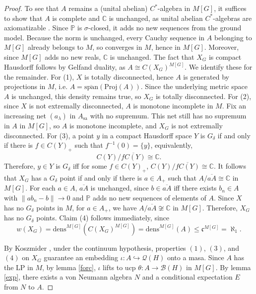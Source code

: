 \documentclass[10pt]{amsart}
\theoremstyle{definition}
\begin{document}
\begin{proof}
    To see that $A$ remains a (unital abelian) $C^*$-algebra in $M[G]$, it suffices to show that $A$ is complete and $\mathbb{C}$ is unchanged, as unital abelian $C^*$-algebras are axiomatizable \cite[2.5.1]{FA21}. Since $\mathbb{P}$ is $\sigma$-closed, it adds no new sequences from the ground model. Because the norm is unchanged, every Cauchy sequence in $A$ belonging to $M[G]$ already belongs to $M$, so converges in $M$, hence in $M[G]$. Moreover, since $M[G]$ adds no new reals, $\mathbb{C}$ is unchanged. The fact that $X_G$ is compact Hausdorff follows by Gelfand duality, as $A\cong C(X_G)^{M[G]}$. We identify these for the remainder. For (1), $X$ is totally disconnected, hence $A$ is generated by projections in $M$, i.e. $A=\overline{\mathrm{span}}(\mathrm{Proj}(A))$. Since the underlying metric space $A$ is unchanged, this density remains true, so $X_G$ is totally disconnected. For (2), since $X$ is not extremally disconnected, $A$ is monotone incomplete in $M$. Fix an increasing net $(a_\lambda)$ in $A_\text{sa}$ with no supremum. This net still has no supremum in $A$ in $M[G]$, so $A$ is monotone incomplete, and $X_G$ is not extremally disconnected. For (3), a point $y$ in a compact Hausdorff space $Y$ is $G_\delta$ if and only if there is $f\in C(Y)_+$ such that $f^{-1}(0)=\{y\}$, equivalently,
    \[C(Y)/\overline{fC(Y)}\cong \mathbb{C}.\]
    Therefore, $y\in Y$ is $G_\delta$ iff for some $f\in C(Y)_+$, $C(Y)/\overline{fC(Y)}\cong \mathbb{C}$. It follows that $X_G$ has a $G_\delta$ point if and only if there is $a\in A_+$ such that $A/\overline{aA}\cong\mathbb{C}$ in $M[G]$. For each $a\in A$, $\overline{aA}$ is unchanged, since $b\in \overline{aA}$ iff there exists $b_n\in A$ with $\|ab_n-b\|\rightarrow0$ and $\mathbb{P}$ adds no new sequences of elements of $A$. Since $X$ has no $G_\delta$ points in $M$, for $a\in A_+$, we have $A/\overline{aA}\not\cong\mathbb{C}$ in $M[G]$. Therefore, $X_G$ has no $G_\delta$ points. Claim (4) follows immediately, since 
    \[w(X_G)=\mathrm{dens}^{M[G]}(C(X_G)^{M[G]})=\mathrm{dens}^{M[G]}(A)\leq\mathfrak{c}^{M[G]}=\aleph_1.\]
    
    By Koszmider \cite[1.1(B)]{KOS}, under the continuum hypothesis, properties $(1)$, $(3)$, and $(4)$ on $X_G$ guarantee an embedding $\iota:A\hookrightarrow\mathscr{Q}(H)$ onto a masa. Since $A$ has the LP in $M$, by lemma \ref{forc}, $\iota$ lifts to ucp $\theta: A\rightarrow\mathscr{B}(H)$ in $M[G]$. By lemma \ref{exp}, there exists a von Neumann algebra $N$ and a conditional expectation $E$ from $N$ to $A$. 
    

\end{proof}
\end{document}
